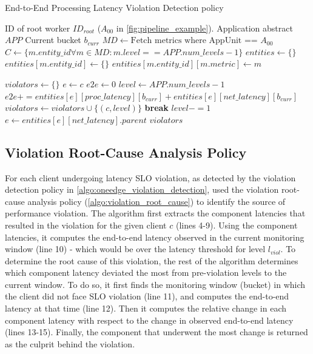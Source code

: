 \begin{algorithm}
\caption{End-to-End Processing Latency Violation Detection policy}
\label{algo:oneedge_violation_detection}
\begin{algorithmic}[1]
\Require ID of root worker $ID_{root}$ ($A_{00}$ in \cref{fig:pipeline_example}).
\Require Application abstract $APP$
\Require Current bucket $b_{curr}$
\State $MD \gets \text{Fetch metrics where AppUnit == }A_{00}$
\State $C \gets \{ m.entity\_id \forall m \in MD : m.level == APP.num\_levels-1 \}$
\State $entities \gets \{\}$ 
        \State $entities[m.entity\_id] \gets \{\}$
    \EndIf
    \State $entities[m.entity\_id][m.metric] \gets m$ 
\EndFor

\State $violators \gets \{\}$
    \State $e \gets c$  
    \State $e2e \gets 0$
    \State $level \gets APP.num\_levels-1$
     
        \State $e2e += entities[e][proc\_latency][b_{curr}] + entities[e][net\_latency][b_{curr}]$
            \State $violators \gets violators \cup \{ \left( c, level \right) \}$
            \State \textbf{break}
        \EndIf
        \State $level -= 1$
        \State $e \gets entities[e][net\_latency].parent$
    \EndWhile
\EndFor
\Return $violators$
\end{algorithmic}
\end{algorithm}

\subsection{Violation Root-Cause Analysis Policy}
For each client undergoing latency SLO violation, as detected by the violation detection policy in \cref{algo:oneedge_violation_detection}, \oneedge{} used the violation root-cause analysis policy (\cref{algo:violation_root_cause}) to identify the source of performance violation. The algorithm first extracts the component latencies that resulted in the violation for the given client $c$ (lines 4-9). Using the component latencies, it computes the end-to-end latency observed in the current monitoring window (line 10) - which would be over the latency threshold for level $l_{viol}$. To determine the root cause of this violation, the rest of the algorithm determines which component latency deviated the most from pre-violation levels to the current window. To do so, it first finds the monitoring window (bucket) in which the client did not face SLO violation (line 11), and computes the end-to-end latency at that time (line 12). Then it computes the relative change in each component latency with respect to the change in observed end-to-end latency (lines 13-15). Finally, the component that underwent the most change is returned as the culprit behind the violation.

